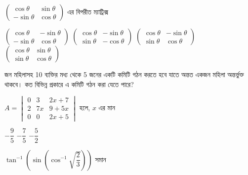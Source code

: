 \documentclass[addpoints]{exam}
\begin{document}
\begin{questions}
\begin{oneparchoices}
\end{oneparchoices}

\question  $\begin{pmatrix}
\cos\theta & \sin\theta \\
-\sin\theta & \cos\theta
\end{pmatrix} $ এর বিপরীত ম্যাট্রিক্স

\begin{oneparchoices}
\choice  $\begin{pmatrix}
\cos\theta & -\sin\theta \\
-\sin\theta & \cos\theta
\end{pmatrix} $
\choice  $\begin{pmatrix}
\cos\theta & -\sin\theta \\
\sin\theta & -\cos\theta
\end{pmatrix} $
\choice  $\begin{pmatrix}
\cos\theta & -\sin\theta \\
\sin\theta & \cos\theta
\end{pmatrix} $
\choice  $\begin{pmatrix}
\cos\theta & \sin\theta \\
\sin\theta & \cos\theta
\end{pmatrix} $

\end{oneparchoices}


 জন মহিলাসহ 10 ব্যক্তির মধ্য থেকে 5 জনের একটি কমিটি গঠন করতে হবে যাতে অন্তত একজন মহিলা অন্তর্ভুক্ত থাকবে। কত বিভিন্ন প্রকারে এ কমিটি গঠন করা যেতে পারে?

\begin{oneparchoices}

\end{oneparchoices}

\question  $ A=\begin{vmatrix}
0 & 3 & 2x+7 \\
2 & 7x & 9+5x \\
0 & 0 & 2x+5
\end{vmatrix} $  হলে, $  x $ এর মান

\begin{oneparchoices}
\choice $ -\dfrac{9}{5} $
\choice  $ -\dfrac{7}{5} $
\choice  $ -\dfrac{5}{2} $

\end{oneparchoices}

\question $ \tan^{-1}(\sin(\cos^{-1}\sqrt{\dfrac{2}{3}})) $ সমান


\end{questions}
\end{document}
